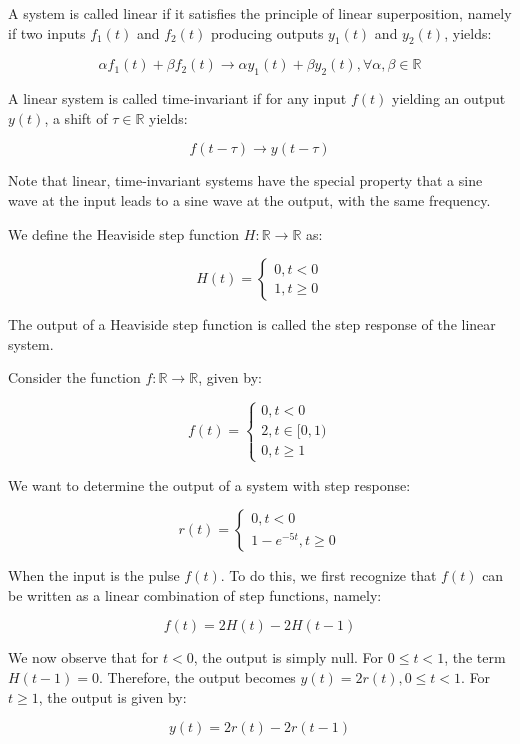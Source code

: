\documentclass[12pt]{article}
\begin{document}
\begin{definition}
    A system is called linear if it satisfies the principle of linear superposition, namely if two inputs $f_1(t)$ and $f_2(t)$ producing outputs $y_1(t)$ and $y_2(t)$, yields:

    \[ \alpha f_1(t) + \beta f_2(t) \to \alpha y_1(t) + \beta y_2(t), \forall \alpha, \beta \in \mathbb{R} \]
\end{definition}

\begin{definition}
    A linear system is called time-invariant if for any input $f(t)$ yielding an output $y(t)$, a shift of $\tau \in \mathbb{R}$ yields:

    \[ f(t - \tau) \to y(t - \tau) \]
\end{definition}

Note that linear, time-invariant systems have the special property that a sine wave at the input leads to a sine wave at the output, with the same frequency.

\begin{definition}
    We define the Heaviside step function $H : \mathbb{R} \to \mathbb{R}$ as:

    \[ H(t) = \begin{cases}
        0, t < 0 \\
        1, t \geq 0
    \end{cases} \]

    The output of a Heaviside step function is called the step response of the linear system.
\end{definition}

\begin{example}
    Consider the function $f : \mathbb{R} \to \mathbb{R}$, given by:

    \[ f(t) = \begin{cases}
        0, t < 0 \\
        2, t \in [0, 1) \\
        0, t \geq 1
    \end{cases} \]

    We want to determine the output of a system with step response:

    \[ r(t) = \begin{cases}
        0, t < 0 \\
        1 - e^{-5t}, t \geq 0
    \end{cases} \]

    When the input is the pulse $f(t)$. To do this, we first recognize that $f(t)$ can be written as a linear combination of step functions, namely:

    \[ f(t) = 2H(t) - 2H(t - 1) \]

    We now observe that for $t < 0$, the output is simply null. For $0 \leq t < 1$, the term $H(t - 1) = 0$. Therefore, the output becomes $y(t) = 2r(t), 0 \leq t < 1$. For $t \geq 1$, the output is given by:

    \[ y(t) = 2r(t) - 2r(t - 1) \]
\end{example}
\end{document}
